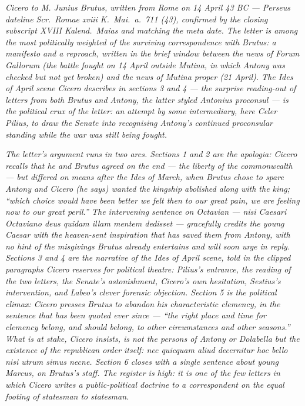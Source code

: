 
\textit{Cicero to M. Junius Brutus, written from Rome on
14 April 43 BC --- Perseus dateline \textit{Scr.\ Romae
xviii K.\ Mai.\ a.\ 711 (43)}, confirmed by the closing
subscript \textit{XVIII Kalend.\ Maias} and matching the
meta date. The letter is among the most politically
weighted of the surviving correspondence with Brutus: a
manifesto and a reproach, written in the brief window
between the news of Forum Gallorum (the battle fought on
14 April outside Mutina, in which Antony was checked but
not yet broken) and the news of Mutina proper (21 April).
The Ides of April scene Cicero describes in sections 3
and 4 --- the surprise reading-out of letters from both
Brutus and Antony, the latter styled \textit{Antonius
proconsul} --- is the political crux of the letter: an
attempt by some intermediary, here Celer Pilius, to draw
the Senate into recognising Antony's continued
proconsular standing while the war was still being
fought.}

\textit{The letter's argument runs in two arcs. Sections
1 and 2 are the apologia: Cicero recalls that he and
Brutus agreed on the end --- the liberty of the
commonwealth --- but differed on means after the Ides of
March, when Brutus chose to spare Antony and Cicero (he
says) wanted the kingship abolished along with the king;
``which choice would have been better we felt then to our
great pain, we are feeling now to our great peril.'' The
intervening sentence on Octavian --- \textit{nisi Caesari
Octaviano deus quidam illam mentem dedisset} ---
gracefully credits the young Caesar with the heaven-sent
inspiration that has saved them from Antony, with no
hint of the misgivings Brutus already entertains and
will soon urge in reply. Sections 3 and 4 are the
narrative of the Ides of April scene, told in the
clipped paragraphs Cicero reserves for political theatre:
Pilius's entrance, the reading of the two letters, the
Senate's astonishment, Cicero's own hesitation, Sestius's
intervention, and Labeo's clever forensic objection.
Section 5 is the political climax: Cicero presses
Brutus to abandon his characteristic clemency, in the
sentence that has been quoted ever since --- ``the right
place and time for clemency belong, and should belong, to
other circumstances and other seasons.'' What is at
stake, Cicero insists, is not the persons of Antony or
Dolabella but the existence of the republican order
itself: \textit{nec quicquam aliud decernitur hoc bello
nisi utrum simus necne}. Section 6 closes with a single
sentence about young Marcus, on Brutus's staff. The
register is high: it is one of the few letters in which
Cicero writes a public-political doctrine to a
correspondent on the equal footing of statesman to
statesman.}
